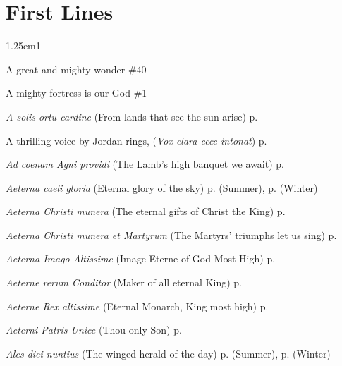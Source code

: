 {}
\fancyhead[RO,LE]{}
\fancyhead[RE,LO]{}

\section*{First Lines}

\small

\begin{hangparas}{1.25em}{1}
\par\noindent
A great and mighty wonder \dotfill \#40
\par\noindent
A mighty fortress is our God \dotfill \#1
\par\noindent
\textit{A solis ortu cardine} (From lands that see the sun arise) \dotfill p. \pageref{ChristmasMattins}
\par\noindent
A thrilling voice by Jordan rings, (\textit{Vox clara ecce intonat}) \dotfill p. \pageref{FirstAdventMattins}
\par\noindent
\textit{Ad coenam Agni providi} (The Lamb's high banquet we await) \dotfill p. \pageref{EasterDayEvensong}
\par\noindent
\textit{Aeterna caeli gloria} (Eternal glory of the sky) \dotfill p. \pageref{FridayMattinsSummer} (Summer), p. \pageref{FridayMattinsWinter} (Winter)
\par\noindent
\textit{Aeterna Christi munera} (The eternal gifts of Christ the King) \dotfill p. \pageref{ApostlesInvitatory}
\par\noindent
\textit{Aeterna Christi munera et Martyrum} (The Martyrs' triumphs let us sing) \dotfill p. \pageref{MartyrsInvitatory}
\par\noindent
\textit{Aeterna Imago Altissime} (Image Eterne of God Most High) \dotfill p. \pageref{ChristTheKingInvitatory}
\par\noindent
\textit{Aeterne rerum Conditor} (Maker of all eternal King) \dotfill p. \pageref{SundayMattinsWinter}
\par\noindent
\textit{Aeterne Rex altissime} (Eternal Monarch, King most high) \dotfill p. \pageref{AscensionInvitatoryHymn}
\par\noindent
\textit{Aeterni Patris Unice} (Thou only Son) \dotfill p. \pageref{MaryMagdaleneMattins}
\par\noindent
\textit{Ales diei nuntius} (The winged herald of the day) \dotfill p. \pageref{TuesdayMattinsSummer} (Summer), p. \pageref{TuesdayMattinsWinter} (Winter)

\end{hangparas}
